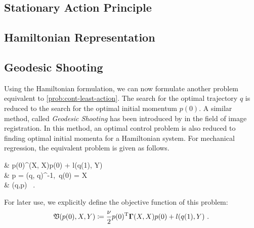 \subsection{Stationary Action Principle}



\subsection{Hamiltonian Representation}



\subsection{Geodesic Shooting}

Using the Hamiltonian formulation, we can now formulate another problem equivalent to \cref{prob:cont-least-action}.
The search for the optimal trajectory $q$ is reduced to the search for the optimal initial momentum $p(0)$.
A similar method, called \emph{Geodesic Shooting} has been introduced by \citet{allassonniere05} in the field of image registration.
In this method, an optimal control problem is also reduced to finding optimal initial momenta for a Hamiltonian system.
For mechanical regression, the equivalent problem is given as follows.
\begin{problem}
	\label{prob:geodesic-shooting}
	\begin{cases}
		&  p(0)^\T \bGamma(X, X)p(0) + l(q(1), Y)\\
		 & p = \bGamma(q, q)^{-1},\ q(0) = X \\
		& (q,p)  \ .
	\end{cases}
\end{problem}
For later use, we explicitly define the objective function of this problem:
\begin{equation}
\label{eq:geodesic-shooting-objective}
\mathfrak{V}(p(0), X, Y) \coloneqq \frac{\nu}{2} p(0)^{\mathrm{T}} \mathbf{\Gamma}(X, X)p(0) + l(q(1), Y) \ .
\end{equation}

